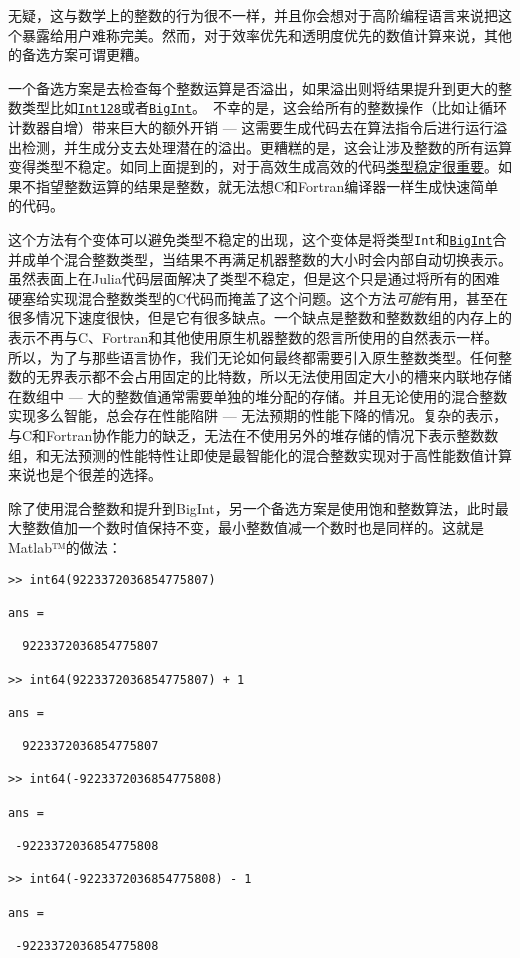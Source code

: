 无疑，这与数学上的整数的行为很不一样，并且你会想对于高阶编程语言来说把这个暴露给用户难称完美。然而，对于效率优先和透明度优先的数值计算来说，其他的备选方案可谓更糟。



一个备选方案是去检查每个整数运算是否溢出，如果溢出则将结果提升到更大的整数类型比如\hyperlink{8012327724714767060}{\texttt{Int128}}或者\hyperlink{423405808990690832}{\texttt{BigInt}}。 不幸的是，这会给所有的整数操作（比如让循环计数器自增）带来巨大的额外开销 — 这需要生成代码去在算法指令后进行运行溢出检测，并生成分支去处理潜在的溢出。更糟糕的是，这会让涉及整数的所有运算变得类型不稳定。如同上面提到的，对于高效生成高效的代码\hyperlink{5872221809740029239}{类型稳定很重要}。如果不指望整数运算的结果是整数，就无法想C和Fortran编译器一样生成快速简单的代码。



这个方法有个变体可以避免类型不稳定的出现，这个变体是将类型\texttt{Int}和\hyperlink{423405808990690832}{\texttt{BigInt}}合并成单个混合整数类型，当结果不再满足机器整数的大小时会内部自动切换表示。虽然表面上在Julia代码层面解决了类型不稳定，但是这个只是通过将所有的困难硬塞给实现混合整数类型的C代码而掩盖了这个问题。这个方法\emph{可能}有用，甚至在很多情况下速度很快，但是它有很多缺点。一个缺点是整数和整数数组的内存上的表示不再与C、Fortran和其他使用原生机器整数的怨言所使用的自然表示一样。所以，为了与那些语言协作，我们无论如何最终都需要引入原生整数类型。任何整数的无界表示都不会占用固定的比特数，所以无法使用固定大小的槽来内联地存储在数组中 — 大的整数值通常需要单独的堆分配的存储。并且无论使用的混合整数实现多么智能，总会存在性能陷阱 — 无法预期的性能下降的情况。复杂的表示，与C和Fortran协作能力的缺乏，无法在不使用另外的堆存储的情况下表示整数数组，和无法预测的性能特性让即使是最智能化的混合整数实现对于高性能数值计算来说也是个很差的选择。



除了使用混合整数和提升到BigInt，另一个备选方案是使用饱和整数算法，此时最大整数值加一个数时值保持不变，最小整数值减一个数时也是同样的。这就是Matlab™的做法：




\begin{lstlisting}
>> int64(9223372036854775807)

ans =

  9223372036854775807

>> int64(9223372036854775807) + 1

ans =

  9223372036854775807

>> int64(-9223372036854775808)

ans =

 -9223372036854775808

>> int64(-9223372036854775808) - 1

ans =

 -9223372036854775808
\end{lstlisting}



